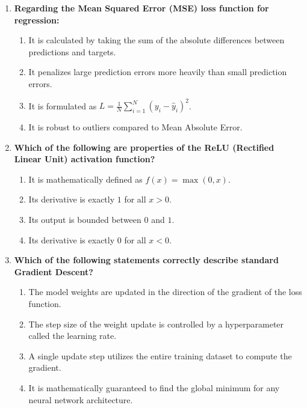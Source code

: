 \documentclass[11pt]{article}
\begin{document}
\begin{enumerate}
    \item \textbf{Regarding the Mean Squared Error (MSE) loss function for regression:}
    \begin{enumerate}
        \item[A)] It is calculated by taking the sum of the absolute differences between predictions and targets.
        \item[B)] It penalizes large prediction errors more heavily than small prediction errors.
        \item[C)] It is formulated as $L = \frac{1}{N} \sum_{i=1}^{N} (y_i - \hat{y}_i)^2$.
        \item[D)] It is robust to outliers compared to Mean Absolute Error.
    \end{enumerate}
    \vspace{0.5cm}

    \item \textbf{Which of the following are properties of the ReLU (Rectified Linear Unit) activation function?}
    \begin{enumerate}
        \item[A)] It is mathematically defined as $f(x) = \max(0, x)$.
        \item[B)] Its derivative is exactly $1$ for all $x > 0$.
        \item[C)] Its output is bounded between $0$ and $1$.
        \item[D)] Its derivative is exactly $0$ for all $x < 0$.
    \end{enumerate}
    \vspace{0.5cm}

    \item \textbf{Which of the following statements correctly describe standard Gradient Descent?}
    \begin{enumerate}
        \item[A)] The model weights are updated in the direction of the gradient of the loss function.
        \item[B)] The step size of the weight update is controlled by a hyperparameter called the learning rate.
        \item[C)] A single update step utilizes the entire training dataset to compute the gradient.
        \item[D)] It is mathematically guaranteed to find the global minimum for any neural network architecture.
    \end{enumerate}
\end{enumerate}
\end{document}
